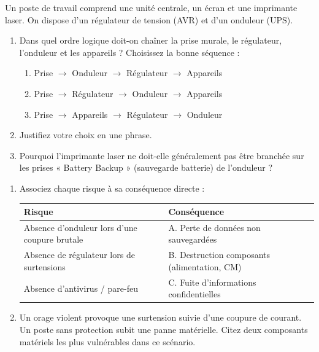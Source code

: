 \documentclass[11pt]{article}
\begin{document}
\begin{exercice}
Un poste de travail comprend une unité centrale, un écran et une imprimante laser. On dispose d'un régulateur de tension (AVR) et d'un onduleur (UPS).
\begin{enumerate}
    \item Dans quel ordre logique doit-on chaîner la prise murale, le régulateur, l'onduleur et les appareils ? Choisissez la bonne séquence :
    \begin{enumerate}
        \item Prise $\to$ Onduleur $\to$ Régulateur $\to$ Appareils
        \item Prise $\to$ Régulateur $\to$ Onduleur $\to$ Appareils
        \item Prise $\to$ Appareils $\to$ Régulateur $\to$ Onduleur
    \end{enumerate}
    \item Justifiez votre choix en une phrase.
    \item Pourquoi l'imprimante laser ne doit-elle généralement pas être branchée sur les prises « Battery Backup » (sauvegarde batterie) de l'onduleur ?
\end{enumerate}
\end{exercice}

\begin{exercice}
\begin{enumerate}
    \item Associez chaque risque à sa conséquence directe :
    \begin{tabular}{|l|l|}
    \hline
    \textbf{Risque} & \textbf{Conséquence} \\ \hline
    Absence d'onduleur lors d'une coupure brutale & A. Perte de données non sauvegardées \\ \hline
    Absence de régulateur lors de surtensions & B. Destruction composants (alimentation, CM) \\ \hline
    Absence d'antivirus / pare-feu & C. Fuite d'informations confidentielles \\ \hline
    \end{tabular}
    \item Un orage violent provoque une surtension suivie d'une coupure de courant. Un poste sans protection subit une panne matérielle. Citez deux composants matériels les plus vulnérables dans ce scénario.
\end{enumerate}
\end{exercice}
\end{document}
